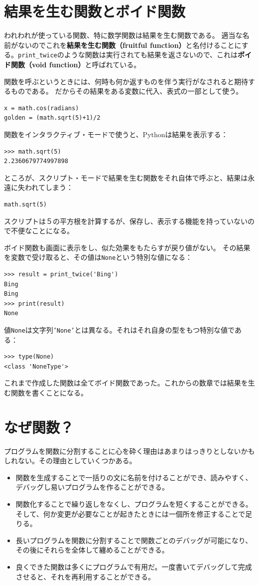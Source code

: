 \documentclass[a4j,12pt,makeidx]{jbook}
\begin{document}
\section{結果を生む関数とボイド関数}
われわれが使っている関数、特に数学関数は結果を生む関数である。
適当な名前がないのでこれを{\bf 結果を生む関数（fruitful function）}と名付けることにする。{\tt print\_twice}のような関数は実行されても結果を返さないので、これは{\bf ボイド関数（void function）}と呼ばれている。 \par
関数を呼ぶというときには、何時も何か返すものを伴う実行がなされると期待するものである。
だからその結果をある変数に代入、表式の一部として使う。
\begin{verbatim}
x = math.cos(radians)
golden = (math.sqrt(5)+1)/2
\end{verbatim} \par
関数をインタラクティブ・モードで使うと、Pythonは結果を表示する：
\begin{verbatim}
>>> math.sqrt(5)
2.2360679774997898
\end{verbatim}
ところが、スクリプト・モードで結果を生む関数をそれ自体で呼ぶと、結果は永遠に失われてしまう：
\begin{verbatim}
math.sqrt(5)
\end{verbatim}
スクリプトは$５$の平方根を計算するが、保存し、表示する機能を持っていないので不便なことになる。\par
ボイド関数も画面に表示をし、似た効果をもたらすが戻り値がない。
その結果を変数で受け取ると、その値は{\tt None}という特別な値になる：
\begin{verbatim}
>>> result = print_twice('Bing')
Bing
Bing
>>> print(result)
None
\end{verbatim}
値{\tt None}は文字列{\tt 'None'}とは異なる。それはそれ自身の型をもつ特別な値である：
\begin{verbatim}
>>> type(None)
<class 'NoneType'>
\end{verbatim}
これまで作成した関数は全てボイド関数であった。これからの数章では結果を生む関数を書くことになる。
%
\section{なぜ関数？}
プログラムを関数に分割することに心を砕く理由はあまりはっきりとしないかもしれない。その理由としていくつかある。
\begin{itemize}
\item 関数を生成することで一括りの文に名前を付けることができ、読みやすく、デバッグし易いプログラムを作ることができる。
\item 関数化することで繰り返しをなくし、プログラムを短くすることができる。そして、何か変更が必要なことが起きたときには一個所を修正することで足りる。
\item 長いプログラムを関数に分割することで関数ごとのデバッグが可能になり、その後にそれらを全体して纏めることができる。
\item 良くできた関数は多くにプログラムで有用だ。一度書いてデバッグして完成させると、それを再利用することができる。
\end{itemize}
%
\end{document}
